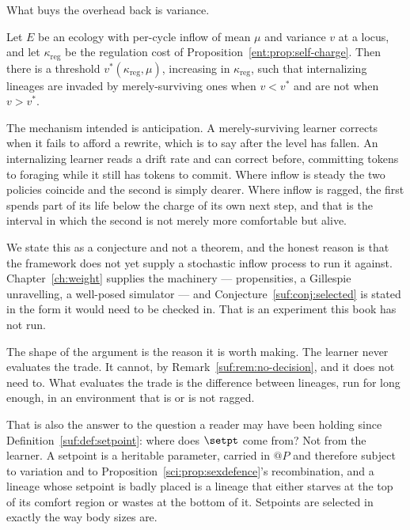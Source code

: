 What buys the overhead back is variance.

\begin{conjecture}
\label{suf:conj:selected}
Let $E$ be an ecology with per-cycle inflow of mean $\mu$ and variance
$v$ at a locus, and let $\kappa_{\mathrm{reg}}$ be the regulation cost of
Proposition~\ref{ent:prop:self-charge}.
Then there is a threshold $v^\ast(\kappa_{\mathrm{reg}}, \mu)$, increasing
in $\kappa_{\mathrm{reg}}$, such that internalizing lineages are invaded
by merely-surviving ones when $v < v^\ast$ and are not when $v > v^\ast$.
\end{conjecture}

The mechanism intended is anticipation.
A merely-surviving learner corrects when it fails to afford a rewrite,
which is to say after the level has fallen.
An internalizing learner reads a drift rate and can correct before,
committing tokens to foraging while it still has tokens to commit.
Where inflow is steady the two policies coincide and the second is simply
dearer.
Where inflow is ragged, the first spends part of its life below the
charge of its own next step, and that is the interval in which the second
is not merely more comfortable but alive.

We state this as a conjecture and not a theorem, and the honest reason is
that the framework does not yet supply a stochastic inflow process to run
it against.
Chapter~\ref{ch:weight} supplies the machinery --- propensities, a
Gillespie unravelling, a well-posed simulator --- and
Conjecture~\ref{suf:conj:selected} is stated in the form it would need
to be checked in.
That is an experiment this book has not run.

\begin{remark}
\label{suf:rem:nobody-chose}
The shape of the argument is the reason it is worth making.
The learner never evaluates the trade.
It cannot, by Remark~\ref{suf:rem:no-decision}, and it does not need to.
What evaluates the trade is the difference between lineages, run for long
enough, in an environment that is or is not ragged.

That is also the answer to the question a reader may have been holding
since Definition~\ref{suf:def:setpoint}: where does $\setpt$ come from?
Not from the learner.
A setpoint is a heritable parameter, carried in $@P$ and therefore subject
to variation and to Proposition~\ref{sci:prop:sexdefence}'s recombination,
and a lineage whose setpoint is badly placed is a lineage that either
starves at the top of its comfort region or wastes at the bottom of it.
Setpoints are selected in exactly the way body sizes are.
\end{remark}

